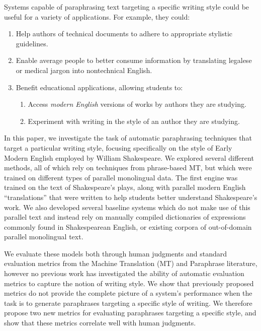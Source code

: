 \documentclass[10pt,a5paper,twoside]{article}
\begin{document}

Systems capable of paraphrasing text targeting a specific writing style could be useful for a variety of applications.  For example, they could:
\begin{enumerate}
  \item Help authors of technical documents to adhere to appropriate stylistic guidelines.  
  \item Enable average people to better consume information by translating legalese or medical jargon into nontechnical English.  
  \item Benefit educational applications, allowing students to:
    \begin{enumerate}
    \item Access \emph{modern English} versions of works by authors they are studying.
    \item Experiment with writing in the style of an author they are studying.
    \end{enumerate}
\end{enumerate}

In this paper, we investigate the task of automatic paraphrasing techniques that target a particular writing style, focusing specifically on the style of Early Modern English employed by William Shakespeare.
We explored several different methods, all of which rely on techniques from phrase-based MT, but which were trained on different types of parallel monolingual data.  The first engine was trained on the text of Shakespeare’s plays, along with parallel modern English “translations” that were written to help students better understand Shakespeare's work.  
We also developed several
baseline systems which do not make use of this parallel text and instead rely on manually compiled dictionaries of expressions commonly found in Shakespearean English, or existing
corpora of out-of-domain parallel monolingual text.

We evaluate these models both through human judgments and standard evaluation metrics from the Machine Translation (MT) and Paraphrase literature, however no previous work has investigated the ability of automatic
evaluation metrics to capture the notion of writing style.  
We show that previously proposed metrics do not provide the complete picture of a system's performance when the task is to generate paraphrases
targeting a specific style of writing.  We therefore propose two new metrics for evaluating paraphrases targeting a specific style, and 
show that these metrics correlate well with human judgments.
\end{document}
